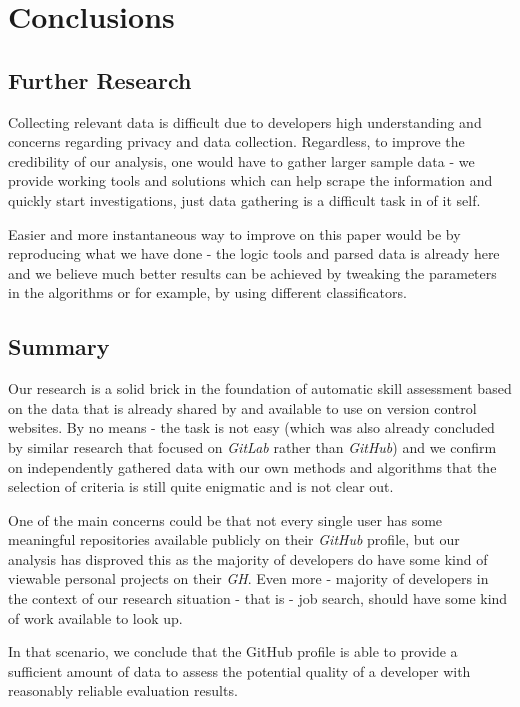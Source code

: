 \section{Conclusions}
\label{sec:conclusions}


\subsection{Further Research}

Collecting relevant data is difficult due to developers high understanding and concerns regarding privacy and data collection. Regardless, to improve the credibility of our analysis, one would have to gather larger sample data - we provide working tools and solutions which can help scrape the information and quickly start investigations, just data gathering is a difficult task in of it self.

Easier and more instantaneous way to improve on this paper would be by reproducing what we have done - the logic tools and parsed data is already here and we believe much better results can be achieved by tweaking the parameters in the algorithms or for example, by using different classificators.


\subsection{Summary}

Our research is a solid brick in the foundation of automatic skill assessment based on the data that is already shared by  and available to use on version control websites. By no means - the task is not easy (which was also already concluded by similar research that focused on \emph{GitLab} rather than \emph{GitHub}) and we confirm on independently gathered data with our own methods and algorithms that the selection of criteria is still quite enigmatic and is not clear out.  

One of the main concerns could be that not every single user has some meaningful repositories available publicly on their \emph{GitHub} profile, but our analysis has disproved this as the majority of developers do have some kind of viewable personal projects on their \emph{GH}. Even more - majority of developers in the context of our research situation - that is - job search, should have some kind of work available to look up.

In that scenario, we conclude that the GitHub profile is able to provide a sufficient amount of data to assess the potential quality of a developer with reasonably reliable evaluation results.
